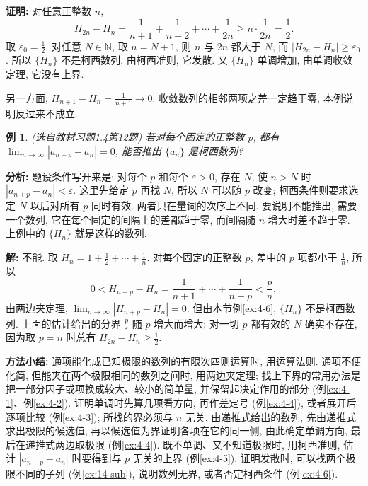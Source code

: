 \documentclass[UTF8,openany]{ctexbook}
\theoremstyle{chinesetextbook}
\newtheorem{example}{例}[section]
\newenvironment{cnproof}{\par\indent\textbf{证明:} \ignorespaces}{\par}
\newenvironment{cnsolution}{\par\indent\textbf{解:} \ignorespaces}{\par}
\begin{document}
\begin{cnproof}
对任意正整数 $n$,
\[
H_{2n}-H_n=\frac1{n+1}+\frac1{n+2}+\cdots+\frac1{2n}\ge n\cdot\frac1{2n}=\frac12.
\]
取 $\displaystyle\varepsilon_0=\frac12$. 对任意 $N\in\mathbb N$, 取 $n=N+1$, 则 $n$ 与 $2n$ 都大于 $N$, 而 $|H_{2n}-H_n|\ge\varepsilon_0$. 所以 $\{H_n\}$ 不是柯西数列, 由柯西准则, 它发散. 又 $\{H_n\}$ 单调增加, 由单调收敛定理, 它没有上界.

另一方面, $\displaystyle H_{n+1}-H_n=\frac1{n+1}\to0$. 收敛数列的相邻两项之差一定趋于零, 本例说明反过来不成立.
\end{cnproof}
\begin{example}
\textnormal{(选自教材习题1.4第12题)} 若对每个固定的正整数 $p$, 都有 $\displaystyle\lim_{n\to\infty}|a_{n+p}-a_n|=0$, 能否推出 $\{a_n\}$ 是柯西数列?
\end{example}
\par\indent\textbf{分析:} 题设条件写开来是: 对每个 $p$ 和每个 $\varepsilon>0$, 存在 $N$, 使 $n>N$ 时 $|a_{n+p}-a_n|<\varepsilon$. 这里先给定 $p$ 再找 $N$, 所以 $N$ 可以随 $p$ 改变; 柯西条件则要求选定 $N$ 以后对所有 $p$ 同时有效. 两者只在量词的次序上不同. 要说明不能推出, 需要一个数列, 它在每个固定的间隔上的差都趋于零, 而间隔随 $n$ 增大时差不趋于零. 上例中的 $\{H_n\}$ 就是这样的数列.
\begin{cnsolution}
不能. 取 $\displaystyle H_n=1+\frac12+\cdots+\frac1n$. 对每个固定的正整数 $p$, 差中的 $p$ 项都小于 $\displaystyle\frac1n$, 所以
\[
0<H_{n+p}-H_n=\frac1{n+1}+\cdots+\frac1{n+p}<\frac pn,
\]
由两边夹定理, $\displaystyle\lim_{n\to\infty}|H_{n+p}-H_n|=0$. 但由本节例\ref{ex:4-6}, $\{H_n\}$ 不是柯西数列. 上面的估计给出的分界 $\displaystyle\frac p\varepsilon$ 随 $p$ 增大而增大; 对一切 $p$ 都有效的 $N$ 确实不存在, 因为取 $p=n$ 时总有 $\displaystyle H_{2n}-H_n\ge\frac12$.
\end{cnsolution}
\par\indent\textbf{方法小结:} 通项能化成已知极限的数列的有限次四则运算时, 用运算法则. 通项不便化简, 但能夹在两个极限相同的数列之间时, 用两边夹定理; 找上下界的常用办法是把一部分因子或项换成较大、较小的简单量, 并保留起决定作用的部分 (例\ref{ex:4-1}、例\ref{ex:4-2}). 证明单调时先算几项看方向, 再作差定号 (例\ref{ex:4-4}), 或者展开后逐项比较 (例\ref{ex:4-3}); 所找的界必须与 $n$ 无关. 由递推式给出的数列, 先由递推式求出极限的候选值, 再以候选值为界证明各项在它的同一侧, 由此确定单调方向, 最后在递推式两边取极限 (例\ref{ex:4-4}). 既不单调、又不知道极限时, 用柯西准则, 估计 $|a_{n+p}-a_n|$ 时要得到与 $p$ 无关的上界 (例\ref{ex:4-5}). 证明发散时, 可以找两个极限不同的子列 (例\ref{ex:14-sub}), 说明数列无界, 或者否定柯西条件 (例\ref{ex:4-6}).
\end{document}
